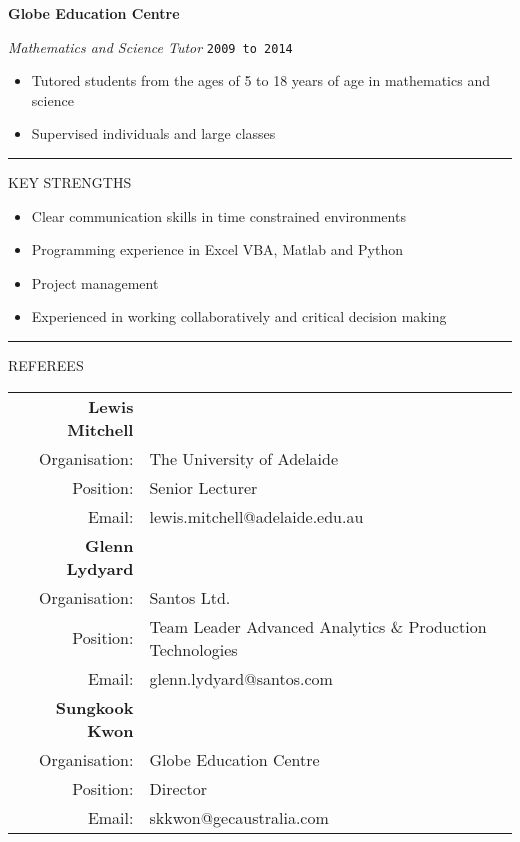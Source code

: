 \documentclass{article}
\newcommand{\HRule}{\rule{\linewidth}{0.5mm}}
\begin{document}
\textbf{\large Globe Education Centre}

\emph{Mathematics and Science Tutor} \hfill \texttt{2009 to 2014}
{\footnotesize
\begin{itemize}
\item Tutored students from the ages of 5 to 18 years of age in mathematics and science
\item Supervised individuals and large classes
\end{itemize} }
\HRule


{\footnotesize KEY STRENGTHS}

\begin{itemize}
\item Clear communication skills in time constrained environments
\item Programming experience in Excel VBA, Matlab and Python
\item Project management
\item Experienced in working collaboratively and critical decision making
\end{itemize}

\HRule


{\footnotesize REFEREES}

\begin{center}



\begin{tabular}[H]{ r l}
\textbf{\large Lewis Mitchell} & \\[0.3cm]
Organisation: & The University of Adelaide \\
Position: & Senior Lecturer \\
Email: & lewis.mitchell@adelaide.edu.au \\[1cm]

\textbf{\large Glenn Lydyard} & \\[0.3cm]
Organisation: & Santos Ltd. \\
Position: & Team Leader Advanced Analytics \& Production Technologies \\
Email: & glenn.lydyard@santos.com \\[1cm]

\textbf{\large Sungkook Kwon} & \\[0.3cm]
Organisation: & Globe Education Centre \\
Position: & Director \\
Email: & skkwon@gecaustralia.com \\[1cm]

\end{tabular}

\end{center}
\end{document}
